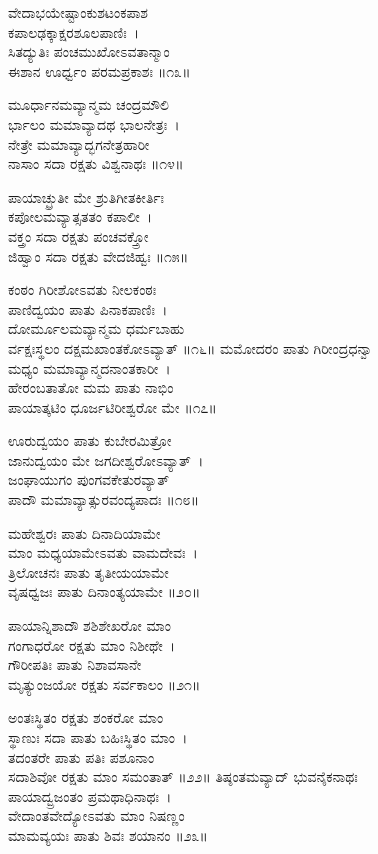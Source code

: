 ವೇದಾಭಯೇಷ್ಟಾಂಕುಶಟಂಕಪಾಶ\\ಕಪಾಲಢಕ್ಕಾಕ್ಷರಶೂಲಪಾಣಿಃ~।\\
ಸಿತದ್ಯುತಿಃ ಪಂಚಮುಖೋಽವತಾನ್ಮಾಂ\\ಈಶಾನ ಊರ್ಧ್ವಂ ಪರಮಪ್ರಕಾಶಃ ॥೧೩॥

ಮೂರ್ಧಾನಮವ್ಯಾನ್ಮಮ ಚಂದ್ರಮೌಲಿ\\ರ್ಭಾಲಂ ಮಮಾವ್ಯಾದಥ ಭಾಲನೇತ್ರಃ~।\\
ನೇತ್ರೇ ಮಮಾವ್ಯಾದ್ಭಗನೇತ್ರಹಾರೀ\\ನಾಸಾಂ ಸದಾ ರಕ್ಷತು ವಿಶ್ವನಾಥಃ ॥೧೪॥

ಪಾಯಾಚ್ಛ್ರುತೀ ಮೇ ಶ್ರುತಿಗೀತಕೀರ್ತಿಃ\\ಕಪೋಲಮವ್ಯಾತ್ಸತತಂ ಕಪಾಲೀ~।\\
ವಕ್ತ್ರಂ ಸದಾ ರಕ್ಷತು ಪಂಚವಕ್ತ್ರೋ\\ಜಿಹ್ವಾಂ ಸದಾ ರಕ್ಷತು ವೇದಜಿಹ್ವಃ ॥೧೫॥

ಕಂಠಂ ಗಿರೀಶೋಽವತು ನೀಲಕಂಠಃ\\ಪಾಣಿದ್ವಯಂ ಪಾತು ಪಿನಾಕಪಾಣಿಃ~।\\
ದೋರ್ಮೂಲಮವ್ಯಾನ್ಮಮ ಧರ್ಮಬಾಹು\\ರ್ವಕ್ಷಃಸ್ಥಲಂ ದಕ್ಷಮಖಾಂತಕೋಽವ್ಯಾತ್ ॥೧೬॥
\newpage
ಮಮೋದರಂ ಪಾತು ಗಿರೀಂದ್ರಧನ್ವಾ\\ಮಧ್ಯಂ ಮಮಾವ್ಯಾನ್ಮದನಾಂತಕಾರೀ~।\\
ಹೇರಂಬತಾತೋ ಮಮ ಪಾತು ನಾಭಿಂ\\ಪಾಯಾತ್ಕಟಿಂ ಧೂರ್ಜಟಿರೀಶ್ವರೋ ಮೇ ॥೧೭॥

ಊರುದ್ವಯಂ ಪಾತು ಕುಬೇರಮಿತ್ರೋ\\ಜಾನುದ್ವಯಂ ಮೇ ಜಗದೀಶ್ವರೋಽವ್ಯಾತ್~।\\
ಜಂಘಾಯುಗಂ ಪುಂಗವಕೇತುರವ್ಯಾತ್\\ಪಾದೌ ಮಮಾವ್ಯಾತ್ಸುರವಂದ್ಯಪಾದಃ ॥೧೮॥

ಮಹೇಶ್ವರಃ ಪಾತು ದಿನಾದಿಯಾಮೇ\\ಮಾಂ ಮಧ್ಯಯಾಮೇಽವತು ವಾಮದೇವಃ~।\\
ತ್ರಿಲೋಚನಃ ಪಾತು ತೃತೀಯಯಾಮೇ\\ವೃಷಧ್ವಜಃ ಪಾತು ದಿನಾಂತ್ಯಯಾಮೇ ॥೨೦॥

ಪಾಯಾನ್ನಿಶಾದೌ ಶಶಿಶೇಖರೋ ಮಾಂ\\ಗಂಗಾಧರೋ ರಕ್ಷತು ಮಾಂ ನಿಶೀಥೇ~।\\
ಗೌರೀಪತಿಃ ಪಾತು ನಿಶಾವಸಾನೇ\\ಮೃತ್ಯುಂಜಯೋ ರಕ್ಷತು ಸರ್ವಕಾಲಂ ॥೨೧॥

ಅಂತಃಸ್ಥಿತಂ ರಕ್ಷತು ಶಂಕರೋ ಮಾಂ\\ಸ್ಥಾಣುಃ ಸದಾ ಪಾತು ಬಹಿಃಸ್ಥಿತಂ ಮಾಂ~।\\
ತದಂತರೇ ಪಾತು ಪತಿಃ ಪಶೂನಾಂ\\ಸದಾಶಿವೋ ರಕ್ಷತು ಮಾಂ ಸಮಂತಾತ್ ॥೨೨॥
\newpage
ತಿಷ್ಠಂತಮವ್ಯಾದ್ ಭುವನೈಕನಾಥಃ\\ಪಾಯಾದ್ವ್ರಜಂತಂ ಪ್ರಮಥಾಧಿನಾಥಃ~।\\
ವೇದಾಂತವೇದ್ಯೋಽವತು ಮಾಂ ನಿಷಣ್ಣಂ\\ ಮಾಮವ್ಯಯಃ ಪಾತು ಶಿವಃ ಶಯಾನಂ ॥೨೩॥

